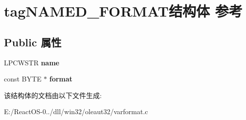 \hypertarget{structtag_n_a_m_e_d___f_o_r_m_a_t}{}\section{tag\+N\+A\+M\+E\+D\+\_\+\+F\+O\+R\+M\+A\+T结构体 参考}
\label{structtag_n_a_m_e_d___f_o_r_m_a_t}
\subsection*{Public 属性}
\begin{DoxyCompactItemize}
\item 
\mbox{\label{structtag_n_a_m_e_d___f_o_r_m_a_t_aed67e232129147b0352512446ac435c3}} 
L\+P\+C\+W\+S\+TR {\bfseries name}
\item 
\mbox{\label{structtag_n_a_m_e_d___f_o_r_m_a_t_a0b7c6ac0661b920fd3dd31f4ee0767b7}} 
const B\+Y\+TE $\ast$ {\bfseries format}
\end{DoxyCompactItemize}


该结构体的文档由以下文件生成\+:\begin{DoxyCompactItemize}
\item 
E\+:/\+React\+O\+S-\/0../dll/win32/oleaut32/varformat.\+c\end{DoxyCompactItemize}
